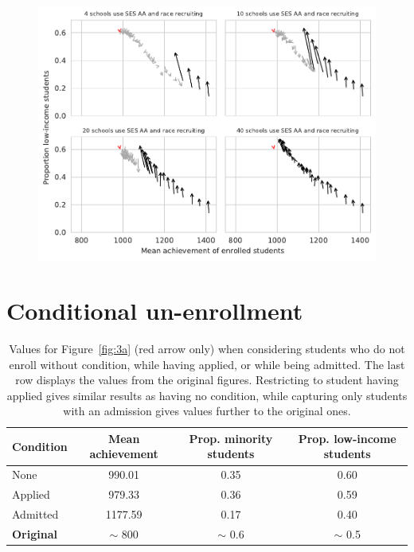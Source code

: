 \begin{appendices}
\begin{figure}[H]
  \centering
  \includegraphics[width=.89\textwidth]{figures/figD3.pdf}
  \caption{}
  \label{fig:d3}
\end{figure}

\section{Conditional un-enrollment}\label{sec:unenroll}

\begin{table}[H]
    \centering
    \begin{tabular}{l c c c} \toprule
      \textbf{Condition} & \textbf{Mean achievement} & \textbf{Prop. minority students} & \textbf{Prop. low-income students} \\ \midrule
      None               & 990.01                    & 0.35                             & 0.60                               \\
      Applied            & 979.33                    & 0.36                             & 0.59                               \\
      Admitted           & 1177.59                   & 0.17                             & 0.40                               \\ \midrule
      \textbf{Original}  & $\sim$ 800                & $\sim$ 0.6                       & $\sim$ 0.5                         \\ \bottomrule
    \end{tabular}
    \caption{Values for Figure~\ref{fig:3a} (red arrow only) when considering students who do not enroll without condition, while having applied, or while being admitted. The last row displays the values from the original figures.
      Restricting to student having applied gives similar results as having no condition, while capturing only students with an admission gives values further to the original ones.}
    \label{tab:unenroll}
\end{table}


\end{appendices}

\clearpage
